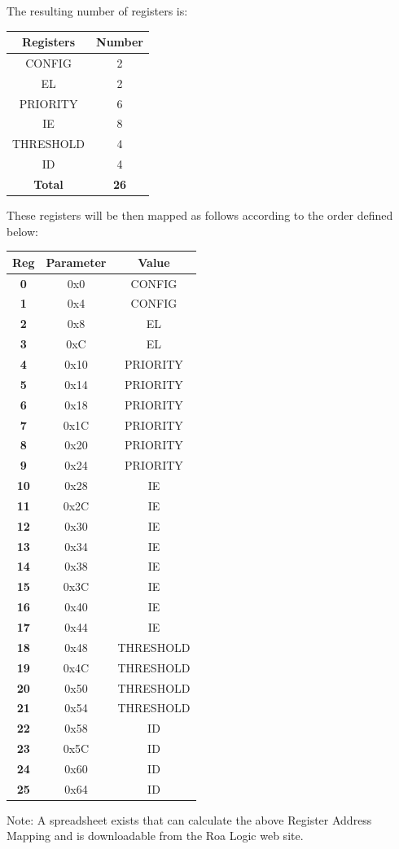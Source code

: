 \documentclass[]{article}
\begin{document}
The resulting number of registers is:

\begin{longtable}[]{@{}cc@{}}
\toprule
\textbf{Registers} & \textbf{Number}\tabularnewline
\midrule
\endhead
CONFIG & 2\tabularnewline
EL & 2\tabularnewline
PRIORITY & 6\tabularnewline
IE & 8\tabularnewline
THRESHOLD & 4\tabularnewline
ID & 4\tabularnewline
\textbf{Total} & \textbf{26}\tabularnewline
\bottomrule
\end{longtable}

These registers will be then mapped as follows according to the order
defined below:

\begin{longtable}[]{@{}ccc@{}}
\toprule
\textbf{Reg} & \textbf{Parameter} & \textbf{Value}\tabularnewline
\midrule
\endhead
\textbf{0} & 0x0 & CONFIG\tabularnewline
\textbf{1} & 0x4 & CONFIG\tabularnewline
\textbf{2} & 0x8 & EL\tabularnewline
\textbf{3} & 0xC & EL\tabularnewline
\textbf{4} & 0x10 & PRIORITY\tabularnewline
\textbf{5} & 0x14 & PRIORITY\tabularnewline
\textbf{6} & 0x18 & PRIORITY\tabularnewline
\textbf{7} & 0x1C & PRIORITY\tabularnewline
\textbf{8} & 0x20 & PRIORITY\tabularnewline
\textbf{9} & 0x24 & PRIORITY\tabularnewline
\textbf{10} & 0x28 & IE\tabularnewline
\textbf{11} & 0x2C & IE\tabularnewline
\textbf{12} & 0x30 & IE\tabularnewline
\textbf{13} & 0x34 & IE\tabularnewline
\textbf{14} & 0x38 & IE\tabularnewline
\textbf{15} & 0x3C & IE\tabularnewline
\textbf{16} & 0x40 & IE\tabularnewline
\textbf{17} & 0x44 & IE\tabularnewline
\textbf{18} & 0x48 & THRESHOLD\tabularnewline
\textbf{19} & 0x4C & THRESHOLD\tabularnewline
\textbf{20} & 0x50 & THRESHOLD\tabularnewline
\textbf{21} & 0x54 & THRESHOLD\tabularnewline
\textbf{22} & 0x58 & ID\tabularnewline
\textbf{23} & 0x5C & ID\tabularnewline
\textbf{24} & 0x60 & ID\tabularnewline
\textbf{25} & 0x64 & ID\tabularnewline
\bottomrule
\end{longtable}

Note: A spreadsheet exists that can calculate the above Register Address
Mapping and is downloadable from the Roa Logic web site.
\end{document}
